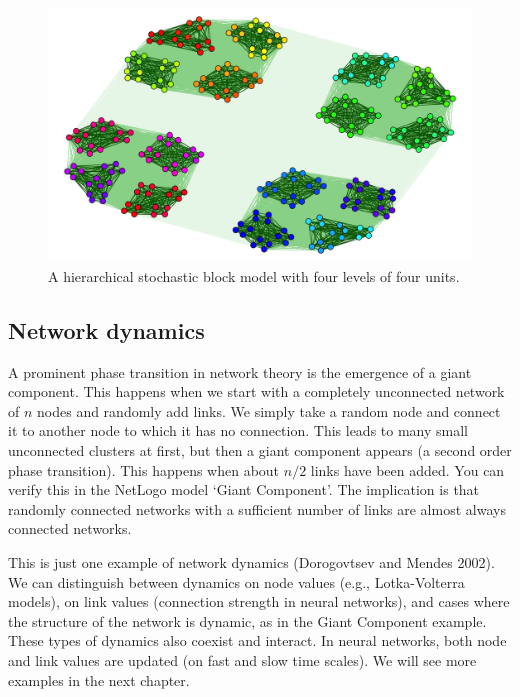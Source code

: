 \documentclass[
  a4paper,
  DIV=11,
  numbers=noendperiod]{scrreprt}
\begin{document}
\begin{figure}

{\centering \includegraphics{media/ch6/fig-ch6-extra.png}

}

\caption{\label{fig-ch6-extra}A hierarchical stochastic block model with
four levels of four units.}

\end{figure}

\hypertarget{sec-Network-dynamics}{%
\subsection{Network dynamics}\label{sec-Network-dynamics}}

A prominent phase transition in network theory is the emergence of a
giant component. This happens when we start with a completely
unconnected network of \(n\) nodes and randomly add links. We simply
take a random node and connect it to another node to which it has no
connection. This leads to many small unconnected clusters at first, but
then a giant component appears (a second order phase transition). This
happens when about \(n/2\) links have been added. You can verify this in
the NetLogo model `Giant Component'. The implication is that randomly
connected networks with a sufficient number of links are almost always
connected networks.

This is just one example of network dynamics (Dorogovtsev and Mendes
2002). We can distinguish between dynamics on node values (e.g.,
Lotka-Volterra models), on link values (connection strength in neural
networks), and cases where the structure of the network is dynamic, as
in the Giant Component example. These types of dynamics also coexist and
interact. In neural networks, both node and link values are updated (on
fast and slow time scales). We will see more examples in the next
chapter.
\end{document}
